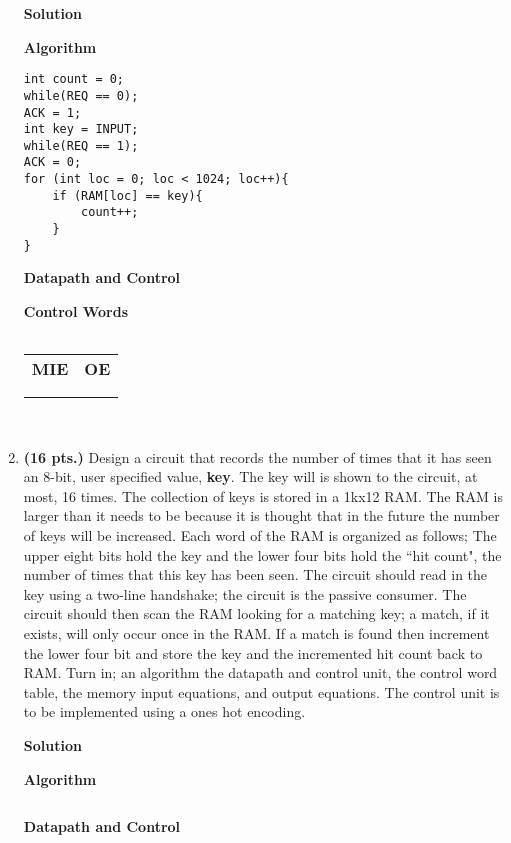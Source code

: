 \begin{enumerate}
        \begin{onlysolution}[fragile]\textbf{Solution}\par
            \textbf{Algorithm}
\begin{verbatim}
int count = 0;
while(REQ == 0);
ACK = 1;
int key = INPUT;
while(REQ == 1);
ACK = 0;
for (int loc = 0; loc < 1024; loc++){
    if (RAM[loc] == key){
        count++;
    }
}
\end{verbatim}
            \textbf{Datapath and Control}\par

            \textbf{Control Words}
            \begin{tabular}{c}
            \end{tabular}
            \begin{tabular}{cc}
                \textbf{MIE} & \textbf{OE} \\
                {$
                    \begin{aligned}
                \end{aligned}$} &
                {$
                    \begin{aligned}
                \end{aligned}$}
            \end{tabular}\\
        \end{onlysolution}

    \item \textbf{ (16 pts.)} Design a circuit that records the number of times that it
        has seen an 8-bit, user specified value, \textbf{ key}.  The key will
        is shown to the circuit, at most, 16 times.  The collection of
        keys is stored in a 1kx12 RAM.  The RAM is larger
        than it needs to be because it is thought that in the future
        the number of keys will be increased.  Each word of the RAM is
        organized as follows; The upper eight bits hold the key and the lower
        four bits hold the ``hit count", the number of times that this key has
        been seen.  The circuit should read in the key using a two-line
        handshake; the circuit is the passive consumer.  The circuit
        should then scan the RAM looking for a matching key; a match, if
        it exists, will only occur once in the RAM.  If a match is
        found then increment the lower four bit and store the key and the
        incremented hit count back to RAM.
        Turn in; an algorithm the datapath and control unit, the control word
        table, the memory input equations, and output equations.
        The control unit is to be implemented using a ones hot encoding.
        \begin{onlysolution}[fragile]\textbf{Solution}\par
            \textbf{Algorithm}
        \begin{verbatim}
\end{verbatim}
            \textbf{Datapath and Control}


\end{onlysolution}
\end{enumerate}
